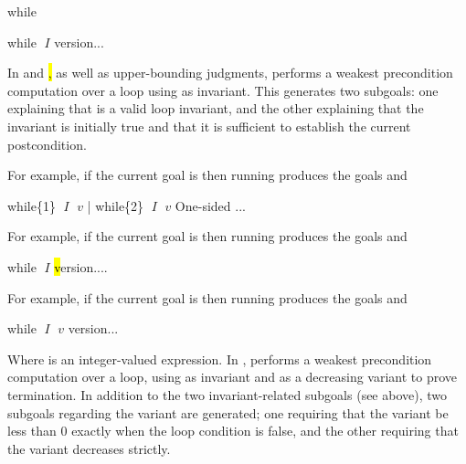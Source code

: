 \begin{tactic}{while}
  \begin{tsyntax}{while $\;I$}
  \prhl version...

  In \prhl and \hl, as well as upper-bounding \phl judgments, performs
  a weakest precondition computation over a loop using  as
  invariant. This generates two subgoals: one explaining that 
  is a valid loop invariant, and the other explaining that the
  invariant is initially true and that it is sufficient to establish
  the current postcondition.

  \bigskip
  For example, if the current goal is
   then
  running 
  produces the goals
  and
  \end{tsyntax}

  \begin{tsyntax}{while\{1\} $\;I$ $\;v$ | while\{2\} $\;I$ $\;v$}
  One-sided \prhl ...

  \bigskip
  For example, if the current goal is
   then
  running 
  produces the goals
  and
  \end{tsyntax}

  \begin{tsyntax}{while $\;I$}
  \hl version....

  \bigskip
  For example, if the current goal is
   then
  running 
  produces the goals
  and
  \end{tsyntax}

  \begin{tsyntax}{while $\;I$ $\;v$}
  \phl version...

  Where  is an integer-valued expression. In \phl, performs a
  weakest precondition computation over a loop, using  as
  invariant and  as a decreasing variant to prove
  termination. In addition to the two invariant-related subgoals (see
  above), two subgoals regarding the variant are generated; one
  requiring that the variant be less than 0 exactly when the loop
  condition is false, and the other requiring that the variant
  decreases strictly.
  \end{tsyntax}
\end{tactic}
